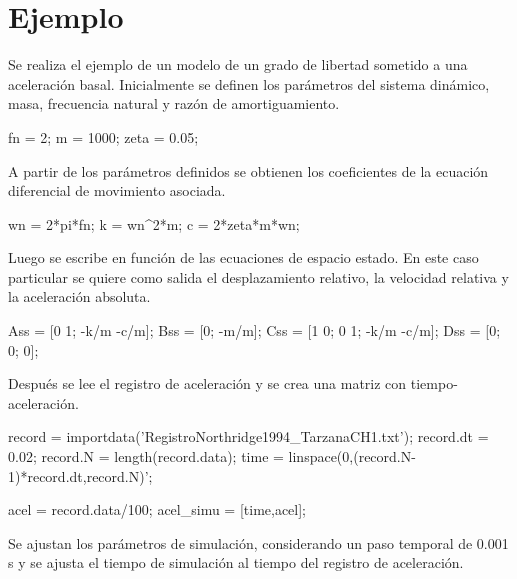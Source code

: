 \section{Ejemplo}

Se realiza el ejemplo de un modelo de un grado de libertad sometido a una aceleración basal.
Inicialmente se definen los parámetros del sistema dinámico, masa, frecuencia natural y razón de amortiguamiento.

\begin{verbatimg}

fn = 2; %
m = 1000; %
zeta = 0.05;
\end{verbatimg}

A partir de los parámetros definidos se obtienen los coeficientes de la ecuación diferencial de movimiento asociada.

\begin{verbatimg}

wn = 2*pi*fn; %
k = wn^2*m; %
c = 2*zeta*m*wn; %
\end{verbatimg}

Luego se escribe en función de las ecuaciones de espacio estado. En este caso particular se quiere como salida el desplazamiento relativo, la velocidad relativa y la aceleración absoluta.

\begin{verbatimg}

Ass = [0 1; -k/m -c/m];
Bss = [0; -m/m];
Css = [1 0; 0 1; -k/m -c/m];
Dss = [0; 0; 0];
\end{verbatimg}

Después se lee el registro de aceleración y se crea una matriz con tiempo-aceleración.

\begin{verbatimg}

record = importdata('RegistroNorthridge1994_TarzanaCH1.txt');
record.dt = 0.02;
record.N = length(record.data);
time = linspace(0,(record.N-1)*record.dt,record.N)';

acel = record.data/100; %
acel_simu = [time,acel];

\end{verbatimg}

Se ajustan los parámetros de simulación, considerando un paso temporal de 0.001 s y se ajusta el tiempo de simulación al tiempo del registro de aceleración.

